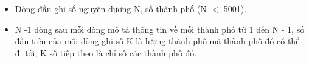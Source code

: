 \begin{itemize}
	\item     Dòng đầu ghi số nguyên dương N, số thành phố (N $<$ 5001).   
	\item     N -1 dòng sau mỗi dòng mô tả thông tin về mỗi thành phố từ 1 đến N - 1, số đầu tiên của mỗi dòng ghi số K là lượng thành phố mà thành phố đó có thể đi tới, K số tiếp theo là chỉ số các thành phố đó.   
\end{itemize}